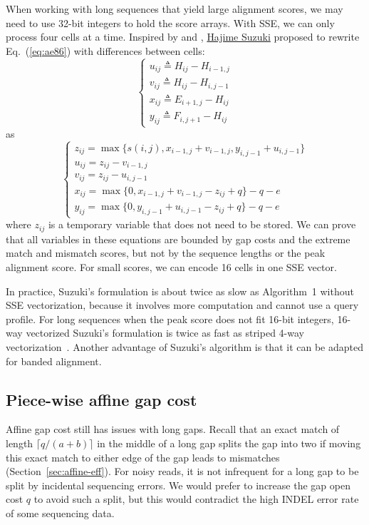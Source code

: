 \documentclass{bioinfo}
\begin{document}
\begin{methods}
When working with long sequences that yield large alignment scores,
we may need to use 32-bit integers to hold the score arrays. With SSE, we can
only process four cells at a time. Inspired by \citet{Myers:1999aa} and
\citet{Loving:2014aa}, \href{https://github.com/ocxtal}{Hajime Suzuki} proposed
to rewrite Eq.~(\ref{eq:ae86}) with differences between cells:
\begin{equation}
\left\{\begin{array}{l}
u_{ij}\triangleq H_{ij}-H_{i-1,j}\\
v_{ij}\triangleq H_{ij}-H_{i,j-1}\\
x_{ij}\triangleq E_{i+1,j}-H_{ij}\\
y_{ij}\triangleq F_{i,j+1}-H_{ij}
\end{array}\right.
\end{equation}
as
\begin{equation}\label{eq:suzuki}
\left\{\begin{array}{l}
z_{ij}=\max\{s(i,j),x_{i-1,j}+v_{i-1,j},y_{i,j-1}+u_{i,j-1}\}\\
u_{ij}=z_{ij}-v_{i-1,j}\\
v_{ij}=z_{ij}-u_{i,j-1}\\
x_{ij}=\max\{0,x_{i-1,j}+v_{i-1,j}-z_{ij}+q\}-q-e\\
y_{ij}=\max\{0,y_{i,j-1}+u_{i,j-1}-z_{ij}+q\}-q-e
\end{array}\right.
\end{equation}
where $z_{ij}$ is a temporary variable that does not need to be stored.  We can
prove that all variables in these equations are bounded by gap costs and the
extreme match and mismatch scores, but not by the sequence lengths or the peak
alignment score. For small scores, we can encode 16 cells in one SSE vector.

In practice, Suzuki's formulation is about twice as slow as Algorithm~1 without
SSE vectorization, because it involves more computation and cannot use
a query profile. For long sequences when the peak score does not fit 16-bit
integers, 16-way vectorized Suzuki's formulation is twice as fast as striped
4-way vectorization~\citep{Farrar:2007hs}. Another advantage of Suzuki's
algorithm is that it can be adapted for banded alignment.

\subsection{Piece-wise affine gap cost}

Affine gap cost still has issues with long gaps. Recall that an exact match of
length $\lceil q/(a+b)\rceil$ in the middle of a long gap splits the gap into
two if moving this exact match to either edge of the gap leads to mismatches
(Section~\ref{sec:affine-eff}). For noisy reads, it is not infrequent for a
long gap to be split by incidental sequencing errors. We would prefer to
increase the gap open cost $q$ to avoid such a split, but this would contradict
the high INDEL error rate of some sequencing data.


\end{methods}
\end{document}

